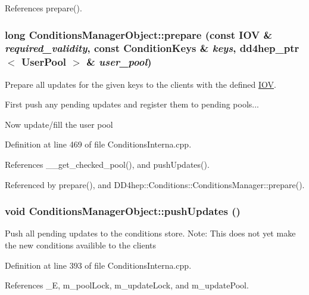 References prepare().\hypertarget{class_d_d4hep_1_1_conditions_1_1_conditions_manager_object_a897ca111b081fb1c6ed8a39739684d0e}{
\subsubsection[{prepare}]{\setlength{\rightskip}{0pt plus 5cm}long ConditionsManagerObject::prepare (const {\bf IOV} \& {\em required\_\-validity}, \/  const {\bf ConditionKeys} \& {\em keys}, \/  {\bf dd4hep\_\-ptr}$<$ {\bf UserPool} $>$ \& {\em user\_\-pool})}}
\label{class_d_d4hep_1_1_conditions_1_1_conditions_manager_object_a897ca111b081fb1c6ed8a39739684d0e}


Prepare all updates for the given keys to the clients with the defined \hyperlink{class_d_d4hep_1_1_i_o_v}{IOV}. 

First push any pending updates and register them to pending pools...

Now update/fill the user pool 

Definition at line 469 of file ConditionsInterna.cpp.

References \_\-\_\-get\_\-checked\_\-pool(), and pushUpdates().

Referenced by prepare(), and DD4hep::Conditions::ConditionsManager::prepare().\hypertarget{class_d_d4hep_1_1_conditions_1_1_conditions_manager_object_a9bda89e54e1ad3b202f7295ec6c102a8}{
\subsubsection[{pushUpdates}]{\setlength{\rightskip}{0pt plus 5cm}void ConditionsManagerObject::pushUpdates ()}}
\label{class_d_d4hep_1_1_conditions_1_1_conditions_manager_object_a9bda89e54e1ad3b202f7295ec6c102a8}


Push all pending updates to the conditions store. Note: This does not yet make the new conditions availible to the clients 

Definition at line 393 of file ConditionsInterna.cpp.

References \_\-E, m\_\-poolLock, m\_\-updateLock, and m\_\-updatePool.

